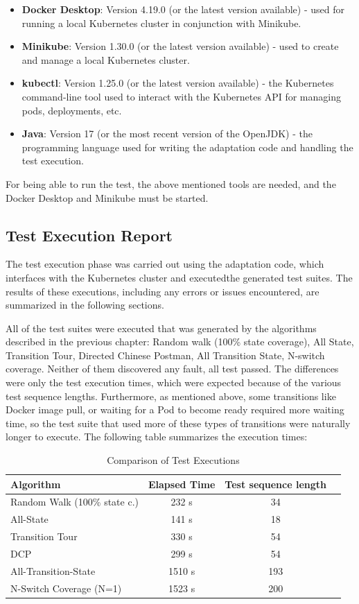 \documentclass[main.tex]{subfiles}
\begin{document}
\begin{itemize}
    \item \textbf{Docker Desktop}: Version 4.19.0 (or the latest version available) - used for running a local Kubernetes cluster in conjunction with Minikube.
    \item \textbf{Minikube}: Version 1.30.0 (or the latest version available) - used to create and manage a local Kubernetes cluster.
    \item \textbf{kubectl}: Version 1.25.0 (or the latest version available) - the Kubernetes command-line tool used to interact with the Kubernetes API for managing pods, deployments, etc.
    \item \textbf{Java}: Version 17 (or the most recent version of the OpenJDK) - the programming language used for writing the adaptation code and handling the test execution.
\end{itemize}
For being able to run the test, the above mentioned tools are needed, and the Docker Desktop and Minikube must be started.

\subsection{Test Execution Report}
The test execution phase was carried out using the adaptation code, which interfaces with the Kubernetes cluster and executedthe generated test suites. The results of these executions, including any errors or issues encountered, are summarized in the following sections.

All of the test suites were executed that was generated by the algorithms described in the previous chapter:
Random walk (100\% state coverage), All State, Transition Tour, Directed Chinese Postman, All Transition State, N-switch coverage. Neither of them discovered any fault, all test passed. The differences were only the test execution times, which were expected because of the various test sequence lengths. Furthermore, as mentioned above, some transitions like Docker image pull, or waiting for a Pod to become ready required more waiting time, so the test suite that used more of these types of transitions were naturally longer to execute.
The following table summarizes the execution times:
\begin{table}[h!]
\centering
\begin{tabular}{|l|c|c|c|}
\hline
\textbf{Algorithm}     & \textbf{Elapsed Time} & \textbf{Test sequence length}\\ \hline
Random Walk (100\% state c.)     & 232 s & 34 \\ \hline
All-State     & 141 s & 18 \\ \hline
Transition Tour     & 330 s    & 54 \\ \hline
DCP     & 299 s    & 54 \\ \hline
All-Transition-State     & 1510 s  & 193\\ \hline
N-Switch Coverage (N=1)     &  1523 s   &  200 \\ \hline
\end{tabular}
\caption{Comparison of Test Executions}
\label{tab:test_exec_comparison}
\end{table}
\end{document}

